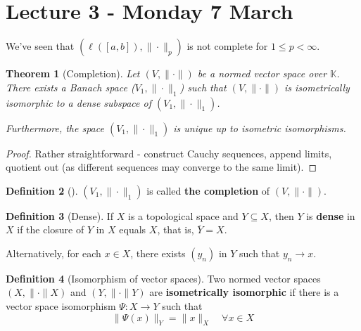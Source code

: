 \documentclass[10pt, oneside, reqno]{amsart}
\theoremstyle{plain}%
\newtheorem{thm}{Theorem}[section]
\theoremstyle{definition}
\newtheorem{defn}[thm]{Definition}
\theoremstyle{remark}
\newcommand{\K}{\mathbb{K}}
\begin{document}
\section{Lecture 3 - Monday 7 March} %
\label{sec:lecture_3_monday_7_march}
We've seen that $(\ell([a,b]), \| \cdot \|_p)$ is not complete for $1 \leq p < \infty$.  

\begin{thm}[Completion] Let $(V, \| \cdot \| )$ be a normed vector space over $\K$.  There exists a Banach space ($V_1, \| \cdot \|_1$) such that $( V, \| \cdot \|)$ is isometrically isomorphic to a dense subspace of $(V_1, \| \cdot \|_1)$.  
	
	Furthermore, the space $( V_1, \| \cdot \|_1)$ is unique up to isometric isomorphisms.	
\end{thm}

\begin{proof}
	Rather straightforward - construct Cauchy sequences, append limits, quotient out (as different sequences may converge to the same limit).
\end{proof}

\begin{defn}[] $(V_1, \| \cdot \|_1)$ is called \textbf{the completion} of $(V, \| \cdot \|)$. 
\end{defn}

\begin{defn}[Dense]
	If $X$ is a topological space and $Y \subseteq X$, then $Y$ is \textbf{dense} in $X$ if the closure of $Y$ in $X$ equals $X$, that is, $\overline{Y} = X$.

Alternatively, for each $x \in X$, there exists $(y_n)$ in $Y$ such that $y_n \rightarrow x$.
\end{defn}

\begin{defn}[Isomorphism of vector spaces]
	Two normed vector spaces $(X, \| \cdot \|X)$ and $(Y, \| \cdot \|Y)$ are \textbf{isometrically isomorphic} if there is a vector space isomorphism $\Psi: X \rightarrow Y$ such that \[
		\| \Psi(x) \|_Y = \| x \|_X \quad \forall x \in X
	\]
\end{defn}
\end{document}

